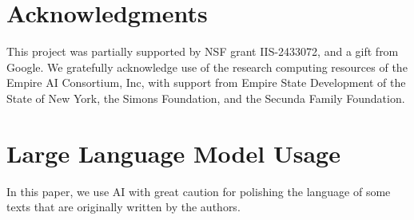 \documentclass{article} %
\begin{document}
\section{Acknowledgments}
This project was partially supported by NSF grant IIS-2433072, and a gift from Google. We gratefully acknowledge use of the research computing resources of the Empire AI Consortium, Inc, with support from Empire State Development of the State of New York, the Simons Foundation, and the Secunda Family Foundation.





\newpage    
\appendix

\section{Large Language Model Usage}
In this paper, we use AI with great caution for polishing the language of some texts that are originally written by the authors.
\end{document}
